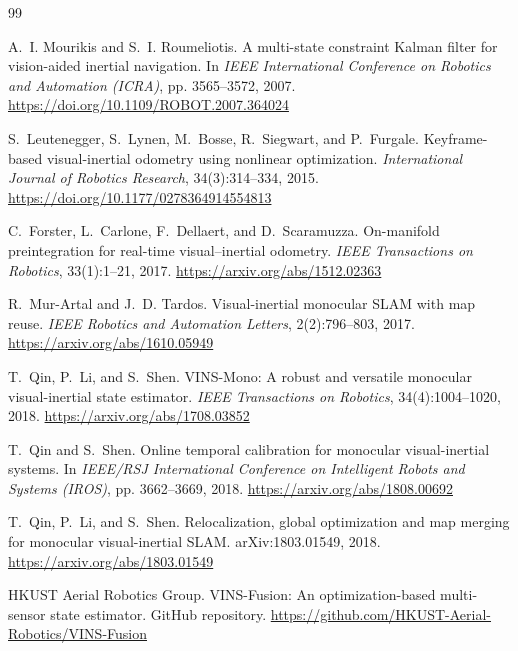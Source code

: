 \documentclass[11pt,a4paper]{article}
\begin{document}
\clearpage
\begin{thebibliography}{99}

A.~I. Mourikis and S.~I. Roumeliotis.
\newblock A multi-state constraint Kalman filter for vision-aided inertial navigation.
\newblock In \textit{IEEE International Conference on Robotics and Automation (ICRA)}, pp. 3565--3572, 2007.
\newblock \url{https://doi.org/10.1109/ROBOT.2007.364024}

S.~Leutenegger, S.~Lynen, M.~Bosse, R.~Siegwart, and P.~Furgale.
\newblock Keyframe-based visual-inertial odometry using nonlinear optimization.
\newblock \textit{International Journal of Robotics Research}, 34(3):314--334, 2015.
\newblock \url{https://doi.org/10.1177/0278364914554813}

C.~Forster, L.~Carlone, F.~Dellaert, and D.~Scaramuzza.
\newblock On-manifold preintegration for real-time visual--inertial odometry.
\newblock \textit{IEEE Transactions on Robotics}, 33(1):1--21, 2017.
\newblock \url{https://arxiv.org/abs/1512.02363}

R.~Mur-Artal and J.~D. Tardos.
\newblock Visual-inertial monocular SLAM with map reuse.
\newblock \textit{IEEE Robotics and Automation Letters}, 2(2):796--803, 2017.
\newblock \url{https://arxiv.org/abs/1610.05949}

T.~Qin, P.~Li, and S.~Shen.
\newblock VINS-Mono: A robust and versatile monocular visual-inertial state estimator.
\newblock \textit{IEEE Transactions on Robotics}, 34(4):1004--1020, 2018.
\newblock \url{https://arxiv.org/abs/1708.03852}

T.~Qin and S.~Shen.
\newblock Online temporal calibration for monocular visual-inertial systems.
\newblock In \textit{IEEE/RSJ International Conference on Intelligent Robots and Systems (IROS)}, pp. 3662--3669, 2018.
\newblock \url{https://arxiv.org/abs/1808.00692}

T.~Qin, P.~Li, and S.~Shen.
\newblock Relocalization, global optimization and map merging for monocular visual-inertial SLAM.
\newblock arXiv:1803.01549, 2018.
\newblock \url{https://arxiv.org/abs/1803.01549}

HKUST Aerial Robotics Group.
\newblock VINS-Fusion: An optimization-based multi-sensor state estimator.
\newblock GitHub repository.
\newblock \url{https://github.com/HKUST-Aerial-Robotics/VINS-Fusion}


\end{thebibliography}
\end{document}
